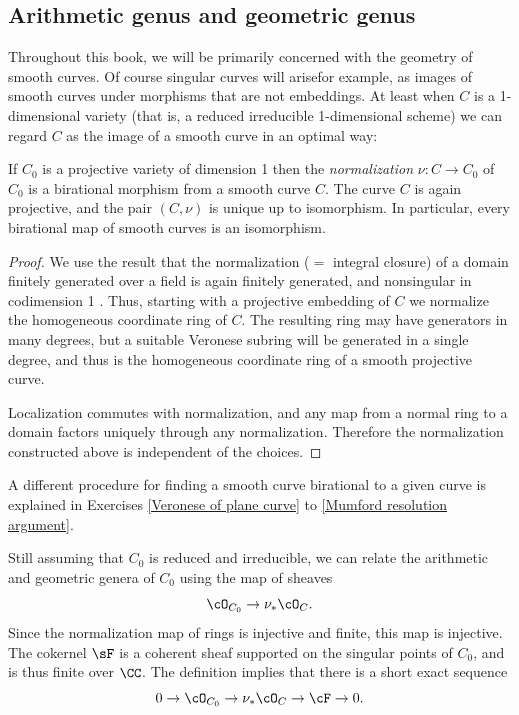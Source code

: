 \subsection*{Arithmetic genus and geometric genus}

Throughout this book, we will be primarily concerned with the geometry of smooth curves. Of course singular curves will arise\emdash for example, as images of smooth curves under morphisms that are not embeddings. At least when $C$ is a 1-dimensional variety (that is, a 
reduced irreducible 1-dimensional scheme) we can  regard $C$ as the image of a smooth curve in an optimal way:

\begin{proposition}\label{resolution of singularities}
If $C_0$ is a projective variety of dimension 1 then the \emph{normalization} $\nu: C \to C_0$ of $C_0$ is a birational
morphism from a smooth curve $C$. The curve $C$ is again projective, and the pair $(C, \nu)$ is
unique up to  isomorphism. In particular, every birational map of smooth curves is an isomorphism.
\unif
\end{proposition}
 
\begin{proof}
  We use the result that the normalization ($=$ integral closure) of a domain
finitely generated over a field is again finitely generated, and nonsingular in codimension 1 \cite[Theorem 4.14 and 11.5]{Eisenbud1995}. Thus,
starting with a projective embedding of $C$ we normalize the homogeneous coordinate ring of $C$. The resulting ring
may have generators in many degrees, but a suitable Veronese subring will be generated in a single degree, and thus
is the homogeneous coordinate ring of a smooth projective curve. 

Localization
commutes with normalization, and any map from a normal ring to a
domain factors uniquely through any normalization. 
Therefore
the normalization constructed above is independent of the choices.
\end{proof}

A different procedure for finding a smooth curve birational to a given curve
is explained in 
Exercises \ref{Veronese of plane curve} to \ref{Mumford resolution argument}.


Still assuming that $C_0$ is reduced and irreducible, we can relate
%
%
%
the
arithmetic and geometric genera
of $C_0$ using the map of sheaves
$$
\cO_{C_0} \to \nu_*\cO_C.
$$
Since the normalization map of rings  is injective and finite, this map is injective. The cokernel $\sF$ is a coherent sheaf supported on the singular points of $C_0$, and is thus finite over $\CC$. 
The definition implies that there is a short exact sequence
$$
0 \to \cO_{C_0} \to \nu_*\cO_C \to \cF \to 0.
$$

